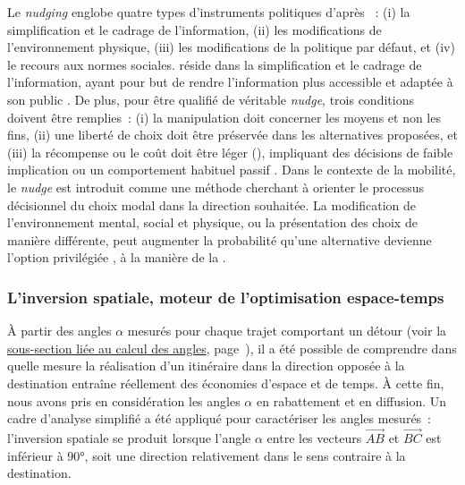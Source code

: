 \begin{refsegment}
{Le \textsl{nudging} englobe quatre types d'instruments politiques d'après \textcolor{blue}{\textcite[22]{lehner_nudging_2016}}~: (i) la simplification et le cadrage de l'information, (ii) les modifications de l'environnement physique, (iii) les modifications de la politique par défaut, et (iv) le recours aux normes sociales.
} réside dans la simplification et le cadrage de l'information, ayant pour but de rendre l'information plus accessible et adaptée à son public \textcolor{blue}{\autocite[22]{lehner_nudging_2016}}. De plus, pour être qualifié de véritable \textsl{nudge}, trois conditions doivent être remplies~: (i) la manipulation doit concerner les moyens et non les fins, (ii) une liberté de choix doit être préservée dans les alternatives proposées, et (iii) la récompense ou le coût doit être léger (), impliquant des décisions de faible implication ou un comportement habituel passif \textcolor{blue}{\autocite[199]{rachlin_choice_2015}}. Dans le contexte de la mobilité, le \textsl{nudge} est introduit comme une méthode cherchant à orienter le processus décisionnel du choix modal dans la direction souhaitée. La modification de l'environnement mental, social et physique, ou la présentation des choix de manière différente, peut augmenter la probabilité qu'une alternative devienne l'option privilégiée \textcolor{blue}{\autocite[12]{mont_nudging_2014}}, à la manière de la .%

\subsubsection*{L'inversion spatiale, moteur de l'optimisation espace-temps
    \label{chap5:inversion-spatiale-optimisation}
    }
 
À partir des angles $\alpha$ mesurés pour chaque trajet comportant un détour (voir la \hyperref[chap5:calcul-angles-detours]{sous-section liée au calcul des angles}, page~\pageref{chap5:calcul-angles-detours}), il a été possible de comprendre dans quelle mesure la réalisation d'un itinéraire dans la direction opposée à la destination entraîne réellement des économies d'espace et de temps. À cette fin, nous avons pris en considération les angles $\alpha$ en rabattement et en diffusion. Un cadre d'analyse simplifié a été appliqué pour caractériser les angles mesurés~: l'inversion spatiale se produit lorsque l'angle $\alpha$ entre les vecteurs $\vec{AB}$ et $\vec{BC}$ est inférieur à 90°, soit une direction relativement dans le sens contraire à la destination.%
    

\end{refsegment}
